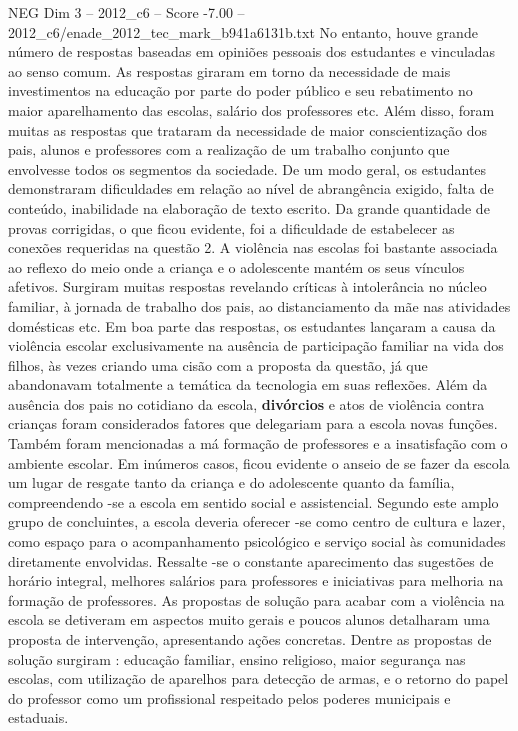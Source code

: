 \begin{textsample}{NEG Dim 3 – 2012\_c6 – Score -7.00 – 2012\_c6/enade\_2012\_tec\_mark\_b941a6131b.txt}
No entanto, houve grande número de respostas baseadas em opiniões pessoais dos estudantes e vinculadas ao senso comum.
As respostas giraram em torno da necessidade de mais investimentos na educação por parte do poder público e seu rebatimento no maior aparelhamento das escolas, salário dos professores etc.
Além disso, foram muitas as respostas que trataram da necessidade de maior conscientização dos pais, alunos e professores com a realização de um trabalho conjunto que envolvesse todos os segmentos da sociedade.
De um modo geral, os estudantes demonstraram dificuldades em relação ao nível de abrangência exigido, falta de conteúdo, inabilidade na elaboração de texto escrito.
Da grande quantidade de provas corrigidas, o que ficou evidente, foi a dificuldade de estabelecer as conexões requeridas na questão 2.
A violência nas escolas foi bastante associada ao reflexo do meio onde a criança e o adolescente mantém os seus vínculos afetivos.
Surgiram muitas respostas revelando críticas à intolerância no núcleo familiar, à jornada de trabalho dos pais, ao distanciamento da mãe nas atividades domésticas etc.
Em boa parte das respostas, os estudantes lançaram a causa da violência escolar exclusivamente na ausência de participação familiar na vida dos filhos, às vezes criando uma cisão com a proposta da questão, já que abandonavam totalmente a temática da tecnologia em suas reflexões.
Além da ausência dos pais no cotidiano da escola, \textbf{divórcios} e atos de violência contra crianças foram considerados fatores que delegariam para a escola novas funções.
Também foram mencionadas a má formação de professores e a insatisfação com o ambiente escolar.
Em inúmeros casos, ficou evidente o anseio de se fazer da escola um lugar de resgate tanto da criança e do adolescente quanto da família, compreendendo -se a escola em sentido social e assistencial.
Segundo este amplo grupo de concluintes, a escola deveria oferecer -se como centro de cultura e lazer, como espaço para o acompanhamento psicológico e serviço social às comunidades diretamente envolvidas.
Ressalte -se o constante aparecimento das sugestões de horário integral, melhores salários para professores e iniciativas para melhoria na formação de professores.
As propostas de solução para acabar com a violência na escola se detiveram em aspectos muito gerais e poucos alunos detalharam uma proposta de intervenção, apresentando ações concretas.
Dentre as propostas de solução surgiram : educação familiar, ensino religioso, maior segurança nas escolas, com utilização de aparelhos para detecção de armas, e o retorno do papel do professor como um profissional respeitado pelos poderes municipais e estaduais.

\end{textsample}
